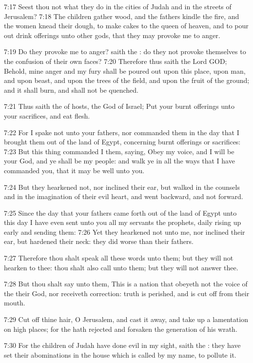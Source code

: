 7:17 Seest thou not what they do in the cities of Judah and in the streets of Jerusalem?  7:18 The children gather wood, and the fathers kindle the fire, and the women knead their dough, to make cakes to the queen of heaven, and to pour out drink offerings unto other gods, that they may provoke me to anger.

7:19 Do they provoke me to anger? saith the \LORD: do they not provoke themselves to the confusion of their own faces?  7:20 Therefore thus saith the Lord GOD; Behold, mine anger and my fury shall be poured out upon this place, upon man, and upon beast, and upon the trees of the field, and upon the fruit of the ground; and it shall burn, and shall not be quenched.

7:21 Thus saith the \LORD of hosts, the God of Israel; Put your burnt offerings unto your sacrifices, and eat flesh.

7:22 For I spake not unto your fathers, nor commanded them in the day that I brought them out of the land of Egypt, concerning burnt offerings or sacrifices: 7:23 But this thing commanded I them, saying, Obey my voice, and I will be your God, and ye shall be my people: and walk ye in all the ways that I have commanded you, that it may be well unto you.

7:24 But they hearkened not, nor inclined their ear, but walked in the counsels and in the imagination of their evil heart, and went backward, and not forward.

7:25 Since the day that your fathers came forth out of the land of Egypt unto this day I have even sent unto you all my servants the prophets, daily rising up early and sending them: 7:26 Yet they hearkened not unto me, nor inclined their ear, but hardened their neck: they did worse than their fathers.

7:27 Therefore thou shalt speak all these words unto them; but they will not hearken to thee: thou shalt also call unto them; but they will not answer thee.

7:28 But thou shalt say unto them, This is a nation that obeyeth not the voice of the \LORD their God, nor receiveth correction: truth is perished, and is cut off from their mouth.

7:29 Cut off thine hair, O Jerusalem, and cast it away, and take up a lamentation on high places; for the \LORD hath rejected and forsaken the generation of his wrath.

7:30 For the children of Judah have done evil in my sight, saith the \LORD: they have set their abominations in the house which is called by my name, to pollute it.

